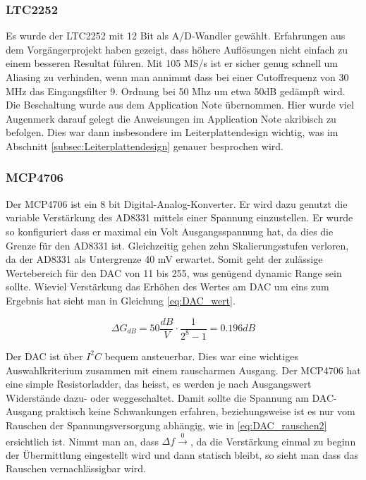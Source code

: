 \subsubsection{LTC2252}
Es wurde der LTC2252\cite{LTC2252} mit 12 Bit als A/D-Wandler gewählt. Erfahrungen aus dem Vorgängerprojekt haben gezeigt, dass höhere Auflösungen nicht einfach zu einem besseren Resultat führen. %
Mit 105 MS/s ist er sicher genug schnell um Aliasing zu verhinden, wenn man annimmt dass bei einer Cutoffrequenz von 30 MHz das Eingangsfilter 9. Ordnung bei 50 Mhz um etwa 50dB gedämpft wird.
Die Beschaltung wurde aus dem Application Note übernommen. Hier wurde viel Augenmerk darauf gelegt die Anweisungen im Application Note akribisch zu befolgen. Dies war dann insbesondere im Leiterplattendesign wichtig, was im Abschnitt \ref{subsec:Leiterplattendesign} genauer besprochen wird.

\subsubsection{MCP4706}
\label{subsec:MCP4706}
Der MCP4706\cite{MCP4706} ist ein 8 bit Digital-Analog-Konverter. Er wird dazu genutzt die variable Verstärkung des AD8331 mittels einer Spannung einzustellen. Er wurde so konfiguriert dass er maximal ein Volt Ausgangsspannung hat, da dies die Grenze für den AD8331 ist. Gleichzeitig gehen zehn Skalierungsstufen verloren, da der AD8331 als Untergrenze 40 mV erwartet. Somit geht der zulässige Wertebereich für den DAC von 11 bis 255, was genügend dynamic Range sein sollte. Wieviel Verstärkung das Erhöhen des Wertes am DAC um eins zum Ergebnis hat sieht man in Gleichung \ref{eq:DAC_wert}.

\begin{equation}
    \Delta G_{dB} = 50 \frac{dB}{V} \cdot \frac{1}{2^8 - 1} = 0.196 dB
\label{eq:DAC_wert}
\end{equation}

Der DAC ist über $I^2 C$ bequem ansteuerbar. Dies war eine wichtiges Auswahlkriterium zusammen mit einem rauscharmen Ausgang. Der MCP4706 hat eine simple Resistorladder, das heisst, es werden je nach Ausgangswert Widerstände dazu- oder weggeschaltet. Damit sollte die Spannung am DAC-Ausgang praktisch keine Schwankungen erfahren, beziehungsweise ist es nur vom Rauschen der Spannungsversorgung abhängig, wie in \ref{eq:DAC_rauschen2} ersichtlich ist. Nimmt man an, dass $\Delta f \xrightarrow 0$, da die Verstärkung einmal zu beginn der Übermittlung eingestellt wird und dann statisch bleibt, so sieht man dass das Rauschen vernachlässigbar wird.

